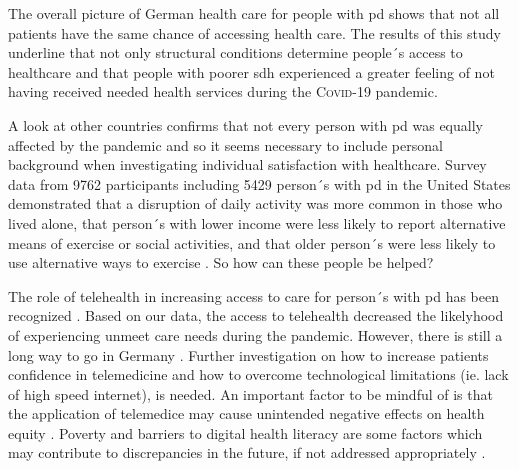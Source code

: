 \documentclass{bmcart}
\begin{document}
The overall picture of German health care for people with \ac{pd} shows that not all patients have the same chance of accessing health care. The results of this study underline that not only structural conditions determine people´s access to healthcare and that people with poorer \ac{sdh} experienced a greater feeling of not having received needed health services during the \textsc{Covid}-19 pandemic.

A look at other countries confirms that not every person with \ac{pd} was equally affected by the pandemic and so it seems necessary to include personal background when investigating individual satisfaction with healthcare. Survey data from 9762 participants including 5429 person´s with \ac{pd} in the United States demonstrated that a disruption of daily activity was more common in those who lived alone, that person´s with lower income were less likely to report alternative means of exercise or social activities, and that older person´s were less likely to use alternative ways to exercise \cite{brown2020effect}. So how can these people be helped?


The role of telehealth in increasing access to care for person´s with \ac{pd} has been recognized \cite{achey2014past, van2021state}. Based on our data, the access to telehealth decreased the likelyhood of experiencing unmeet care needs during the pandemic. However, there is still a long way to go in Germany \cite{eggers2020care}. Further investigation on how to increase patients confidence in telemedicine and how to overcome technological limitations (ie. lack of high speed internet), is needed. An important factor to be mindful of is that the application of telemedice may cause unintended negative effects on health equity \cite{samuels2021digital}. Poverty and barriers to digital health literacy are some factors which may contribute to discrepancies in the future, if not addressed appropriately \cite{samuels2021digital}. 

\end{document}
